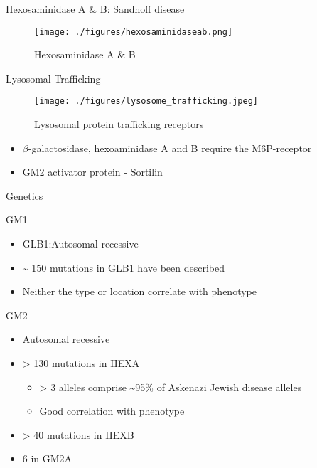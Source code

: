 \documentclass[presentation, smaller]{beamer}
\begin{document}
\begin{frame}[label={sec:orgheadline9}]{Hexosaminidase A \& B: Sandhoff disease}
\begin{figure}[htb]
\centering
\texttt{[image: ./figures/hexosaminidaseab.png]}
\caption[hexb]{\label{fig:hexb}
Hexosaminidase A \& B}
\end{figure}
\end{frame}


\begin{frame}[label={sec:orgheadline10}]{Lysosomal Trafficking}
\begin{figure}[htb]
\centering
\texttt{[image: ./figures/lysosome\_trafficking.jpeg]}
\caption[traf]{\label{fig:traf}
Lysosomal protein trafficking receptors}
\end{figure}

\footnotesize
\begin{itemize}
\item \(\beta\)-galactosidase, hexoaminidase A and B require the M6P-receptor
\item GM2 activator protein - Sortilin
\end{itemize}
\end{frame}


\begin{frame}[label={sec:orgheadline11}]{Genetics}
\begin{block}{GM1}
\begin{itemize}
\item GLB1:Autosomal recessive
\item \textasciitilde{} 150 mutations in GLB1 have been described
\item Neither the type or location correlate with phenotype
\end{itemize}
\end{block}

\begin{block}{GM2}
\begin{itemize}
\item Autosomal recessive
\item > 130 mutations in HEXA
\begin{itemize}
\item > 3 alleles comprise \textasciitilde{}95\% of Askenazi Jewish disease alleles
\item Good correlation with phenotype
\end{itemize}
\item > 40 mutations in HEXB
\item 6 in GM2A
\end{itemize}
\end{block}
\end{frame}
\end{document}
